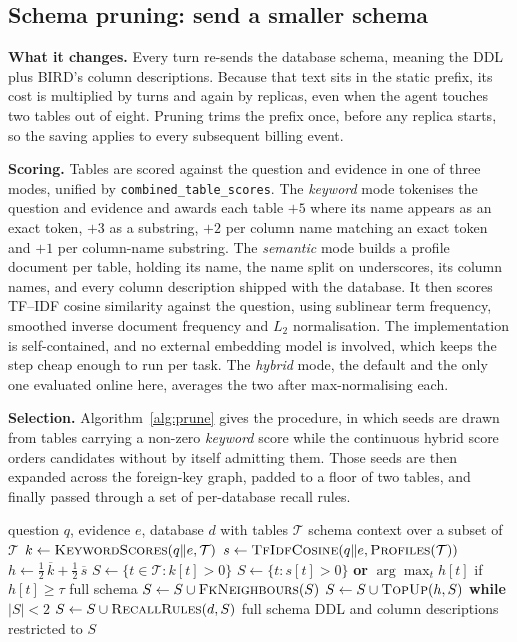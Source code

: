 \documentclass[conference]{IEEEtran}
\begin{document}
\subsection{Schema pruning: send a smaller schema}\label{sec:prune}

\textbf{What it changes.} Every turn re-sends the database schema, meaning the
DDL plus BIRD's column descriptions. Because that text sits in the static prefix, its
cost is multiplied by turns and again by replicas, even when the agent touches
two tables out of eight. Pruning trims the prefix once, before any replica
starts, so the saving applies to every subsequent billing event.

\textbf{Scoring.} Tables are scored against the question and evidence in one of
three modes, unified by \texttt{combined\_table\_scores}. The \emph{keyword}
mode tokenises the question and evidence and awards each table $+5$ where its
name appears as an exact token, $+3$ as a substring, $+2$ per column name
matching an exact token and $+1$ per column-name substring. The \emph{semantic}
mode builds a profile document per table, holding its name, the name split on
underscores, its column names, and every column description shipped with the
database. It then scores TF--IDF cosine similarity against the question, using
sublinear term frequency, smoothed inverse document frequency and $L_2$
normalisation. The implementation is self-contained, and no external embedding model
is involved, which keeps the step cheap enough to run per task. The
\emph{hybrid} mode, the default and the only one evaluated online here, averages
the two after max-normalising each.

\textbf{Selection.} Algorithm~\ref{alg:prune} gives the procedure, in which
seeds are drawn from tables carrying a non-zero \emph{keyword} score while the
continuous hybrid score orders candidates without by itself admitting them.
Those seeds are then expanded across the foreign-key graph, padded to a floor of
two tables, and finally passed through a set of per-database recall rules.

\begin{algorithm}[t]
\caption{Recall-aware hybrid schema pruning}\label{alg:prune}
\begin{algorithmic}[1]
\Require question $q$, evidence $e$, database $d$ with tables $\mathcal{T}$
\Ensure schema context over a subset of $\mathcal{T}$
\State $k \gets \textsc{KeywordScores}(q \Vert e, \mathcal{T})$
\State $s \gets \textsc{TfIdfCosine}(q \Vert e, \textsc{Profiles}(\mathcal{T}))$
\State $h \gets \tfrac{1}{2}\,\overline{k} + \tfrac{1}{2}\,\overline{s}$
\State $S \gets \{t \in \mathcal{T} : k[t] > 0\}$
  \State $S \gets \{t : s[t] > 0\}$ \textbf{or} $\arg\max_t h[t]$ if
    $h[t] \geq \tau$
\EndIf
{}
  \State \Return full schema
\EndIf
\State $S \gets S \cup \textsc{FkNeighbours}(S)$
\State $S \gets S \cup \textsc{TopUp}(h, S)$ \textbf{while} $|S| < 2$
\State $S \gets S \cup \textsc{RecallRules}(d, S)$
 \State \Return full schema \EndIf
\State \Return DDL and column descriptions restricted to $S$
\end{algorithmic}
\end{algorithm}
\end{document}
